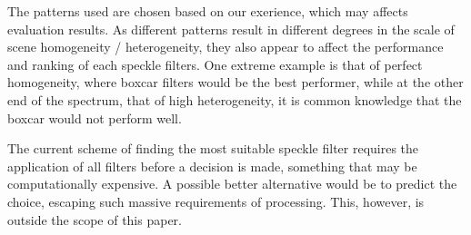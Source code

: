 \documentclass[journal]{IEEEtran}
\begin{document}
The patterns used are chosen based on our exerience, which may affects evaluation results. 
As different patterns result in different degrees in the scale of scene homogeneity / heterogeneity, 
	they also appear to affect the performance and ranking of each speckle filters.
One extreme example is that of perfect homogeneity, where boxcar filters would be the best performer,
	while at the other end of the spectrum, that of high heterogeneity, it is common knowledge that the boxcar 
	would not perform well.



The current scheme of finding the most suitable speckle filter requires the application of all filters before 
a decision is made, something that may be computationally expensive.
A possible better alternative would be to predict the choice, escaping such massive requirements of processing.
This, however, is outside the scope of this paper.
\end{document}
